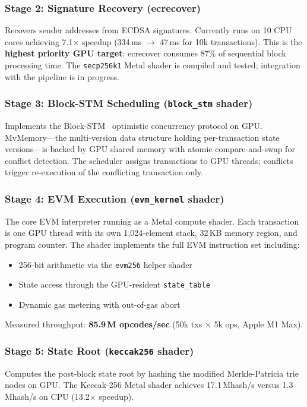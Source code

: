 \documentclass[11pt]{article}
\begin{document}
\subsubsection{Stage 2: Signature Recovery (ecrecover)}
Recovers sender addresses from ECDSA signatures. Currently runs on 10 CPU cores achieving
7.1$\times$ speedup (334\,ms $\to$ 47\,ms for 10k transactions). This is the \textbf{highest
priority GPU target}: ecrecover consumes 87\% of sequential block processing time. The
\texttt{secp256k1} Metal shader is compiled and tested; integration with the pipeline is
in progress.

\subsubsection{Stage 3: Block-STM Scheduling (\texttt{block\_stm} shader)}
Implements the Block-STM~\cite{blockstm} optimistic concurrency protocol on GPU.
MvMemory---the multi-version data structure holding per-transaction state versions---is
backed by GPU shared memory with atomic compare-and-swap for conflict detection. The
scheduler assigns transactions to GPU threads; conflicts trigger re-execution of the
conflicting transaction only.

\subsubsection{Stage 4: EVM Execution (\texttt{evm\_kernel} shader)}
The core EVM interpreter running as a Metal compute shader. Each transaction is one GPU
thread with its own 1{,}024-element stack, 32\,KB memory region, and program counter. The
shader implements the full EVM instruction set including:
\begin{itemize}
\item 256-bit arithmetic via the \texttt{evm256} helper shader
\item State access through the GPU-resident \texttt{state\_table}
\item Dynamic gas metering with out-of-gas abort
\end{itemize}

Measured throughput: \textbf{85.9\,M opcodes/sec} (50k txs $\times$ 5k ops, Apple M1 Max).

\subsubsection{Stage 5: State Root (\texttt{keccak256} shader)}
Computes the post-block state root by hashing the modified Merkle-Patricia trie nodes
on GPU. The Keccak-256 Metal shader achieves 17.1\,Mhash/s versus 1.3\,Mhash/s on CPU
(13.2$\times$ speedup).
\end{document}
